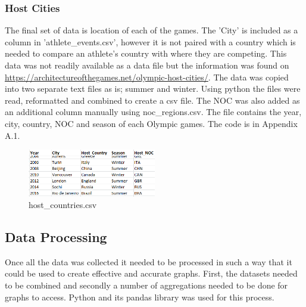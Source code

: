 \documentclass[a4 paper, 12pt]{article}
\begin{document}
    \subsubsection{Host Cities}
    The final set of data is location of each of the games. The 'City' is included as a column in 'athlete\_events.csv', however it is not paired with a country which is needed to compare an athlete's country with where they are competing. This data was not readily available as a data file but the information was found on \url{https://architectureofthegames.net/olympic-host-cities/}. The data was copied into two separate text files as is; summer and winter. Using python the files were read, reformatted and combined to create a csv file. The NOC was also added as an additional column manually using noc\_regions.csv. The file contains the year, city, country, NOC and season of each Olympic games. The code is in Appendix A.1.
        \begin{figure} [H]
            \centering
            \includegraphics[width=0.5\textwidth, frame]
            {./images/data/host_countries.png}  
            \caption{host\_countries.csv}                  
        \end{figure}  

\subsection{Data Processing}
    Once all the data was collected it needed to be processed in such a way that it could be used to create effective and accurate graphs. First, the datasets needed to be combined and secondly a number of aggregations needed to be done for graphs to access. Python and its pandas library was used for this process.
\end{document}
